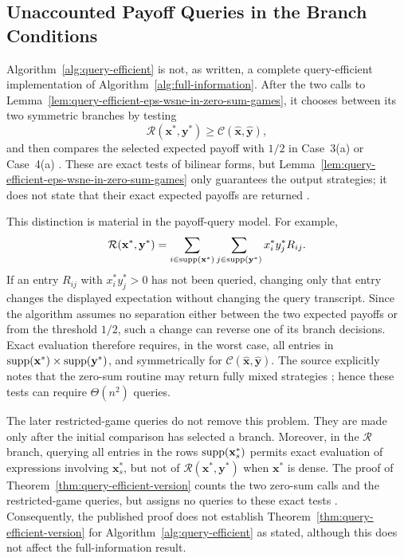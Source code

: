 \subsection{Unaccounted Payoff Queries in the Branch Conditions}

Algorithm~\ref{alg:query-efficient} is not, as written, a complete query-efficient implementation of Algorithm~\ref{alg:full-information}. After the two calls to Lemma~\ref{lem:query-efficient-eps-wsne-in-zero-sum-games}, it chooses between its two symmetric branches by testing
\[
  \mathcal{R}(\mathbf{x}^*,\mathbf{y}^*) \geq \mathcal{C}(\hat{\mathbf{x}},\hat{\mathbf{y}}),
\]
and then compares the selected expected payoff with \(1/2\) in Case~3(a) or
Case~4(a) \cite[Algorithm~2]{12WSNE}. These are exact tests of bilinear forms, but Lemma~\ref{lem:query-efficient-eps-wsne-in-zero-sum-games} only guarantees the output strategies; it does not state that their exact expected payoffs are returned \cite[Corollary~5.5]{fearnleySavani16}.

This distinction is material in the payoff-query model. For example,
\[
  \mathcal{R}(\mathbf{x}^*,\mathbf{y}^*)
  =\sum_{i\in\operatorname{supp}(\mathbf{x}^*)}
  \sum_{j\in\operatorname{supp}(\mathbf{y}^*)}
  x_i^*y_j^*R_{ij}.
\]
If an entry \(R_{ij}\) with \(x_i^*y_j^*>0\) has not been queried, changing only that entry changes the displayed expectation without changing the query transcript. Since the algorithm assumes no separation either between the two expected payoffs or from the threshold \(1/2\), such a change can reverse one of its branch decisions. Exact evaluation therefore requires, in the worst case, all entries in \(\operatorname{supp}(\mathbf{x}^*)\times\operatorname{supp}(\mathbf{y}^*)\), and symmetrically for \(\mathcal{C}(\hat{\mathbf{x}},\hat{\mathbf{y}})\). The source explicitly notes that the zero-sum routine may return fully mixed strategies \cite[pp.~1092--1093]{12WSNE}; hence these tests can require \(\Theta(n^2)\) queries.

The later restricted-game queries do not remove this problem. They are made only after the initial comparison has selected a branch. Moreover, in the \(\mathcal{R}\) branch, querying all entries in the rows \(\operatorname{supp}(\mathbf{x}_s^*)\) permits exact evaluation of expressions involving \(\mathbf{x}_s^*\), but not of \(\mathcal{R}(\mathbf{x}^*,\mathbf{y}^*)\) when \(\mathbf{x}^*\) is dense. The proof of Theorem~\ref{thm:query-efficient-version} counts the two zero-sum calls and the restricted-game queries, but assigns no queries to these exact tests \cite[proof of Theorem~2]{12WSNE}. Consequently, the published proof does not establish Theorem~\ref{thm:query-efficient-version} for Algorithm~\ref{alg:query-efficient} as stated, although this does not affect the full-information result.

